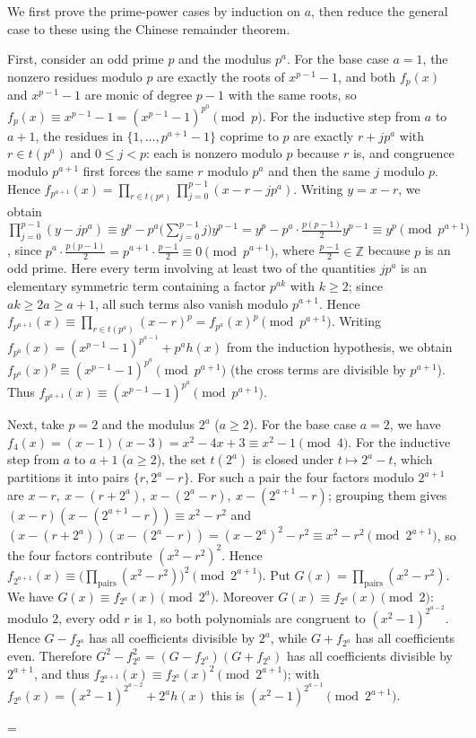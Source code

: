 \documentclass[11pt]{article}
\makeatletter
\theoremstyle{ntstyle}
\let\nt@closedisplay\]
\def\nt@guardedclose{\@ifnextchar\par{\nt@closeafterpar}{\@ifnextchar\end{\postdisplaypenalty\@M\nt@closedisplay}{\nt@closedisplay}}}
\def\nt@closeafterpar\par{\@ifnextchar\par{\nt@closeafterpar}{\@ifnextchar\end{\postdisplaypenalty\@M\nt@closedisplay\par}{\nt@closedisplay\par}}}
\renewenvironment{proof}[1][\proofname]{\par
  \pushQED{\qed}\normalfont\topsep\medskipamount\edef\nt@afterproof{\@endparpenalty=\the\@endparpenalty\relax}\@beginparpenalty\@M\@endparpenalty\@M\let\]\nt@guardedclose\trivlist\item[]\textit{#1\@addpunct{.}} \ignorespaces}{\ifvmode\addpenalty\@M\fi\popQED\nt@afterproof\endtrivlist\@endpefalse}
\makeatother
\begin{document}
\begin{proof} We first prove the prime-power cases by
	induction on $a$, then reduce the general case to these using the Chinese remainder theorem.

	First, consider an odd prime $p$ and the modulus $p^a$. For the base case $a =
		1$, the nonzero residues modulo $p$ are exactly the roots of $x^{p-1}
		- 1$, and both $f_p(x)$ and $x^{p-1} - 1$ are monic of degree $p-1$
	with the same roots, so $f_p(x) \equiv x^{p-1} - 1 =
			(x^{p-1}-1)^{p^{0}} \pmod{p}$. For the inductive step from $a$ to $a+1$, the
	residues in $\{1,\ldots,p^{a+1}-1\}$ coprime to $p$ are exactly $r+jp^a$ with $r\in t(p^a)$ and $0\le j<p$: each is nonzero modulo $p$ because $r$ is, and congruence modulo $p^{a+1}$ first forces the same $r$ modulo $p^a$ and then the same $j$ modulo $p$. Hence $f_{p^{a+1}}(x) =
		\prod_{r \in t(p^{a})} \prod_{j=0}^{p-1}(x - r - j p^{a})$. Writing
	$y = x - r$, we obtain $\prod_{j=0}^{p-1}(y - j p^{a}) \equiv y^{p} -
		p^{a}\big(\textstyle\sum_{j=0}^{p-1} j\big) y^{p-1} = y^{p} -
		p^{a}\cdot\frac{p(p-1)}{2}y^{p-1} \equiv y^{p} \pmod{p^{a+1}}$, since
	$p^{a}\cdot\frac{p(p-1)}{2} = p^{a+1}\cdot\frac{p-1}{2}
		\equiv 0 \pmod{p^{a+1}}$, where $\frac{p-1}{2} \in \mathbb{Z}$ because
	$p$ is an odd prime. Here every term involving at least two of the quantities $jp^a$ is
	an elementary symmetric term containing a factor $p^{ak}$ with
	$k\ge2$; since $ak\ge2a\ge a+1$, all such terms also vanish modulo
	$p^{a+1}$. Hence $f_{p^{a+1}}(x) \equiv
		\prod_{r\in t(p^a)}(x-r)^p=f_{p^a}(x)^p \pmod{p^{a+1}}$. Writing
	$f_{p^{a}}(x) = (x^{p-1}-1)^{p^{a-1}} + p^{a} h(x)$ from the
	induction hypothesis, we obtain $f_{p^{a}}(x)^{p} \equiv (x^{p-1}-1)^{p^{a}}
		\pmod{p^{a+1}}$ (the cross terms are divisible by $p^{a+1}$). Thus
	$f_{p^{a+1}}(x) \equiv (x^{p-1}-1)^{p^{a}} \pmod{p^{a+1}}$.

	Next, take $p=2$ and the modulus $2^a$ ($a \ge 2$). For the base case $a = 2$, we have $f_4(x) = (x-1)(x-3) = x^{2} - 4x + 3
		\equiv x^{2} - 1 \pmod{4}$. For the inductive step from $a$ to $a+1$ ($a \ge 2$),
	the set $t(2^{a})$ is closed under $t \mapsto 2^{a} - t$, which partitions it
	into pairs $\{r, 2^{a}-r\}$. For such a pair the four factors modulo
	$2^{a+1}$ are $x - r,\ x - (r + 2^{a}),\ x - (2^{a} - r),\ x -
			(2^{a+1} - r)$; grouping them gives $(x-r)(x-(2^{a+1}-r)) \equiv x^{2} - r^{2}$
	and $(x-(r+2^{a}))(x-(2^{a}-r)) = (x-2^{a})^{2} - r^{2} \equiv x^{2}
		- r^{2} \pmod{2^{a+1}}$, so the four factors contribute $(x^{2}-r^{2})^{2}$.
	Hence $f_{2^{a+1}}(x) \equiv
		\big(\prod_{\text{pairs}}(x^{2}-r^{2})\big)^{2} \pmod{2^{a+1}}$.
	Put $G(x)=\prod_{\text{pairs}}(x^{2}-r^{2})$. We have $G(x)\equiv f_{2^{a}}(x)\pmod{2^{a}}$. Moreover $G(x)\equiv f_{2^{a}}(x)\pmod{2}$: modulo $2$, every odd $r$ is $1$, so both polynomials are congruent to $(x^2-1)^{2^{a-2}}$. Hence $G-f_{2^a}$ has all coefficients divisible by $2^a$, while $G+f_{2^a}$ has all coefficients even. Therefore $G^2-f_{2^a}^2=(G-f_{2^a})(G+f_{2^a})$ has all coefficients divisible by $2^{a+1}$, and thus $f_{2^{a+1}}(x) \equiv f_{2^{a}}(x)^{2}
		\pmod{2^{a+1}}$; with $f_{2^{a}}(x) = (x^{2}-1)^{2^{a-2}} + 2^{a}
		h(x)$ this is $(x^{2}-1)^{2^{a-1}} \pmod{2^{a+1}}$.


\end{proof}
\end{document}
